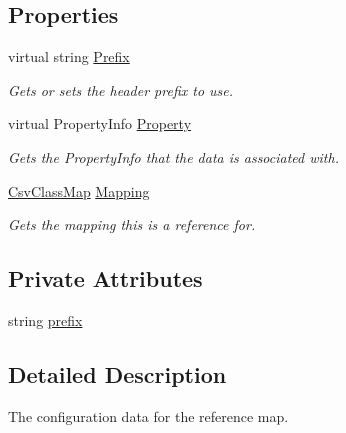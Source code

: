 \subsection*{Properties}
\begin{DoxyCompactItemize}
\item 
virtual string \hyperlink{a00054_a687fe65f1a2b4301f283e9333c282f9c}{Prefix}
\begin{DoxyCompactList}\small\item\em Gets or sets the header prefix to use. \end{DoxyCompactList}\item 
virtual Property\-Info \hyperlink{a00054_a5386ac40fb3ea290944f05cbee99bfcb}{Property}
\begin{DoxyCompactList}\small\item\em Gets the Property\-Info that the data is associated with. \end{DoxyCompactList}\item 
\hyperlink{a00038}{Csv\-Class\-Map} \hyperlink{a00054_af2343065df03de92b6b9803ed2bb4f87}{Mapping}
\begin{DoxyCompactList}\small\item\em Gets the mapping this is a reference for. \end{DoxyCompactList}\end{DoxyCompactItemize}
\subsection*{Private Attributes}
\begin{DoxyCompactItemize}
\item 
string \hyperlink{a00054_a24263cbdacd2dd0db9bbe22676a6d989}{prefix}
\end{DoxyCompactItemize}


\subsection{Detailed Description}
The configuration data for the reference map. 



